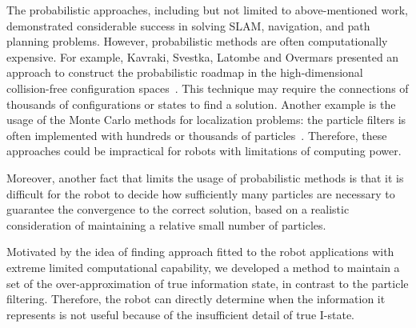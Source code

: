 The probabilistic approaches, including but not limited to above-mentioned work,
demonstrated considerable success in solving SLAM, navigation, and path planning problems. 
However, probabilistic methods are often computationally expensive. 
For example, Kavraki, Svestka, Latombe and Overmars presented an approach to construct the probabilistic roadmap in the high-dimensional collision-free configuration spaces~\cite{KavSve+96}. 
This technique may require the connections of thousands of configurations or states
to find a solution.
Another example is the usage of the Monte Carlo methods for localization problems:
the particle filters is often implemented with hundreds or thousands of particles~\cite{ThrFox+00}. 
Therefore, these approaches could be impractical for robots with limitations of computing power.

Moreover, another fact that limits the usage of probabilistic methods is that it
is difficult for the robot to decide how sufficiently many particles are
necessary to guarantee the convergence to the correct solution, based on a
realistic consideration of maintaining a relative small number of particles. 

Motivated by the idea of finding approach fitted to the robot applications 
with extreme limited computational capability, we developed a method
to maintain a set of the over-approximation of true information state, in
contrast to the particle filtering. 
Therefore, the robot can directly determine when the information it represents 
is not useful because of the insufficient detail of true I-state.

